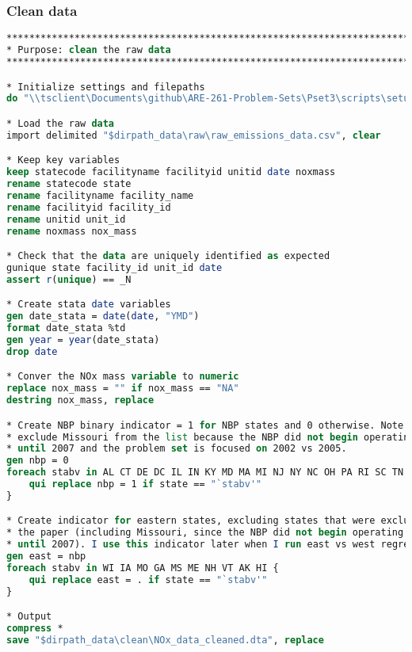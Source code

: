 \documentclass[12pt]{article}
\begin{document}
\subsubsection*{Clean data}
\begin{lstlisting}[language=Stata, numbers=none]
********************************************************************************
* Purpose: clean the raw data
********************************************************************************

* Initialize settings and filepaths
do "\\tsclient\Documents\github\ARE-261-Problem-Sets\Pset3\scripts\setup.do"

* Load the raw data
import delimited "$dirpath_data\raw\raw_emissions_data.csv", clear

* Keep key variables
keep statecode facilityname facilityid unitid date noxmass
rename statecode state
rename facilityname facility_name
rename facilityid facility_id
rename unitid unit_id
rename noxmass nox_mass

* Check that the data are uniquely identified as expected
gunique state facility_id unit_id date
assert r(unique) == _N

* Create stata date variables
gen date_stata = date(date, "YMD")
format date_stata %td
gen year = year(date_stata)
drop date

* Conver the NOx mass variable to numeric
replace nox_mass = "" if nox_mass == "NA"
destring nox_mass, replace

* Create NBP binary indicator = 1 for NBP states and 0 otherwise. Note that I 
* exclude Missouri from the list because the NBP did not begin operating there
* until 2007 and the problem set is focused on 2002 vs 2005.
gen nbp = 0 
foreach stabv in AL CT DE DC IL IN KY MD MA MI NJ NY NC OH PA RI SC TN VA WV {
	qui replace nbp = 1 if state == "`stabv'"
}

* Create indicator for eastern states, excluding states that were excluded in
* the paper (including Missouri, since the NBP did not begin operating there 
* until 2007). I use this indicator later when I run east vs west regressions
gen east = nbp
foreach stabv in WI IA MO GA MS ME NH VT AK HI {
	qui replace east = . if state == "`stabv'"
}

* Output
compress *
save "$dirpath_data\clean\NOx_data_cleaned.dta", replace
\end{lstlisting}
\end{document}
